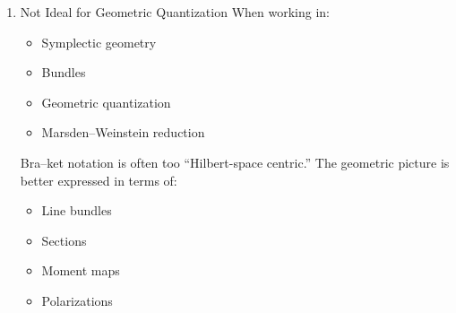 \documentclass[12pt]{article}
\begin{document}
\begin{enumerate}
It encourages formal calculation over structural analysis.
   \item
Not Ideal for Geometric Quantization
When working in:
\begin{itemize}
\item
  Symplectic geometry
\item
  Bundles
\item
  Geometric quantization
\item
  Marsden--Weinstein reduction
\end{itemize}
Bra--ket notation is often too ``Hilbert-space centric.''
The geometric picture is better expressed in terms of:
\begin{itemize}
\item
  Line bundles
\item
  Sections
\item
  Moment maps
\item
  Polarizations
\end{itemize}
\end{enumerate}
\end{document}
